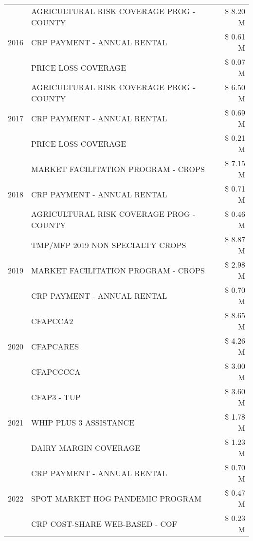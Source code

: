 \begin{tabular}{llr}
\cline{1-3}
\multirow[t]{3}{*}{2016} & AGRICULTURAL RISK COVERAGE PROG - COUNTY & \$ 8.20 M \\
 & CRP PAYMENT - ANNUAL RENTAL & \$ 0.61 M \\
 & PRICE LOSS COVERAGE & \$ 0.07 M \\
\cline{1-3}
\multirow[t]{3}{*}{2017} & AGRICULTURAL RISK COVERAGE PROG - COUNTY & \$ 6.50 M \\
 & CRP PAYMENT - ANNUAL RENTAL & \$ 0.69 M \\
 & PRICE LOSS COVERAGE & \$ 0.21 M \\
\cline{1-3}
\multirow[t]{3}{*}{2018} & MARKET FACILITATION PROGRAM - CROPS & \$ 7.15 M \\
 & CRP PAYMENT - ANNUAL RENTAL & \$ 0.71 M \\
 & AGRICULTURAL RISK COVERAGE PROG - COUNTY & \$ 0.46 M \\
\cline{1-3}
\multirow[t]{3}{*}{2019} & TMP/MFP 2019 NON SPECIALTY CROPS & \$ 8.87 M \\
 & MARKET FACILITATION PROGRAM - CROPS & \$ 2.98 M \\
 & CRP PAYMENT - ANNUAL RENTAL & \$ 0.70 M \\
\cline{1-3}
\multirow[t]{3}{*}{2020} & CFAPCCA2 & \$ 8.65 M \\
 & CFAPCARES & \$ 4.26 M \\
 & CFAPCCCCA & \$ 3.00 M \\
\cline{1-3}
\multirow[t]{3}{*}{2021} & CFAP3 - TUP & \$ 3.60 M \\
 & WHIP PLUS 3 ASSISTANCE & \$ 1.78 M \\
 & DAIRY MARGIN COVERAGE & \$ 1.23 M \\
\cline{1-3}
\multirow[t]{3}{*}{2022} & CRP PAYMENT - ANNUAL RENTAL & \$ 0.70 M \\
 & SPOT MARKET HOG PANDEMIC PROGRAM & \$ 0.47 M \\
 & CRP COST-SHARE WEB-BASED - COF & \$ 0.23 M \\
\cline{1-3}
\bottomrule
\end{tabular}
